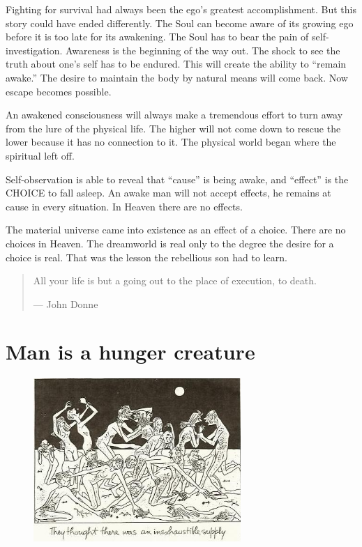\documentclass[12pt,letterpaper]{article}
\begin{document}
Fighting for survival had always been the ego's greatest
accomplishment. But this story could have ended differently. The Soul
can become aware of its growing ego before it is too late for its
awakening. The Soul has to bear the pain of
self-investigation. Awareness is the beginning of the way out. The
shock to see the truth about one's self has to be endured. This will
create the ability to ``remain awake.'' The desire to maintain the
body by natural means will come back. Now escape becomes possible.

An awakened consciousness will always make a tremendous effort to turn
away from the lure of the physical life. The higher will not come down
to rescue the lower because it has no connection to it. The physical
world began where the spiritual left off.

Self-observation is able to reveal that ``cause'' is being awake, and
``effect'' is the CHOICE to fall asleep. An awake man will not accept
effects, he remains at cause in every situation. In Heaven there are
no effects.

The material universe came into existence as an effect of a
choice. There are no choices in Heaven. The dreamworld is real only to
the degree the desire for a choice is real. That was the lesson the
rebellious son had to learn.

\begin{quotation} All your life is but a going out to the place of
execution, to death.

--- John Donne
\end{quotation}

\section{Man is a hunger creature}


\begin{figure}
  \includegraphics[width=0.7\textwidth,bb=0 0 463 334]{p6.jpg}
\end{figure}
\end{document}
